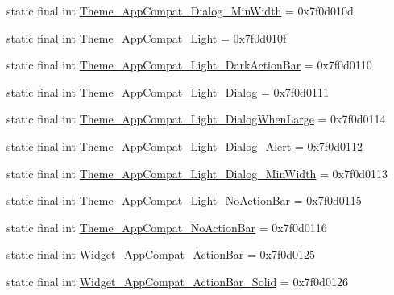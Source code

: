 \begin{DoxyCompactItemize}
\item 
static final int \mbox{\hyperlink{classandroid_1_1support_1_1v7_1_1appcompat_1_1_r_1_1style_a7da7f25d0d41b1aedcd0191db68fba8d}{Theme\+\_\+\+App\+Compat\+\_\+\+Dialog\+\_\+\+Min\+Width}} = 0x7f0d010d
\item 
static final int \mbox{\hyperlink{classandroid_1_1support_1_1v7_1_1appcompat_1_1_r_1_1style_a23c0b66055cf7effa3936aacc729427f}{Theme\+\_\+\+App\+Compat\+\_\+\+Light}} = 0x7f0d010f
\item 
static final int \mbox{\hyperlink{classandroid_1_1support_1_1v7_1_1appcompat_1_1_r_1_1style_a6de852fddd40a4c6612af07b17de8796}{Theme\+\_\+\+App\+Compat\+\_\+\+Light\+\_\+\+Dark\+Action\+Bar}} = 0x7f0d0110
\item 
static final int \mbox{\hyperlink{classandroid_1_1support_1_1v7_1_1appcompat_1_1_r_1_1style_a1ebb6bd5786d54f735c9379d2b83720f}{Theme\+\_\+\+App\+Compat\+\_\+\+Light\+\_\+\+Dialog}} = 0x7f0d0111
\item 
static final int \mbox{\hyperlink{classandroid_1_1support_1_1v7_1_1appcompat_1_1_r_1_1style_ac8cb621e0bc006a8e787cc01fa5a019b}{Theme\+\_\+\+App\+Compat\+\_\+\+Light\+\_\+\+Dialog\+When\+Large}} = 0x7f0d0114
\item 
static final int \mbox{\hyperlink{classandroid_1_1support_1_1v7_1_1appcompat_1_1_r_1_1style_a3154c269ba4155524296e31f2fb85495}{Theme\+\_\+\+App\+Compat\+\_\+\+Light\+\_\+\+Dialog\+\_\+\+Alert}} = 0x7f0d0112
\item 
static final int \mbox{\hyperlink{classandroid_1_1support_1_1v7_1_1appcompat_1_1_r_1_1style_a31c9ec44a65783612f967848055d20e9}{Theme\+\_\+\+App\+Compat\+\_\+\+Light\+\_\+\+Dialog\+\_\+\+Min\+Width}} = 0x7f0d0113
\item 
static final int \mbox{\hyperlink{classandroid_1_1support_1_1v7_1_1appcompat_1_1_r_1_1style_ab207bbb6037b2de95c4385c5bb64c186}{Theme\+\_\+\+App\+Compat\+\_\+\+Light\+\_\+\+No\+Action\+Bar}} = 0x7f0d0115
\item 
static final int \mbox{\hyperlink{classandroid_1_1support_1_1v7_1_1appcompat_1_1_r_1_1style_a8519c957330167d04ac87177caf9ae06}{Theme\+\_\+\+App\+Compat\+\_\+\+No\+Action\+Bar}} = 0x7f0d0116
\item 
static final int \mbox{\hyperlink{classandroid_1_1support_1_1v7_1_1appcompat_1_1_r_1_1style_af9ccaa30f85b041b6f0c7f5077795979}{Widget\+\_\+\+App\+Compat\+\_\+\+Action\+Bar}} = 0x7f0d0125
\item 
static final int \mbox{\hyperlink{classandroid_1_1support_1_1v7_1_1appcompat_1_1_r_1_1style_a05dee95ca4a31058f1e8749708f4e244}{Widget\+\_\+\+App\+Compat\+\_\+\+Action\+Bar\+\_\+\+Solid}} = 0x7f0d0126

\end{DoxyCompactItemize}
